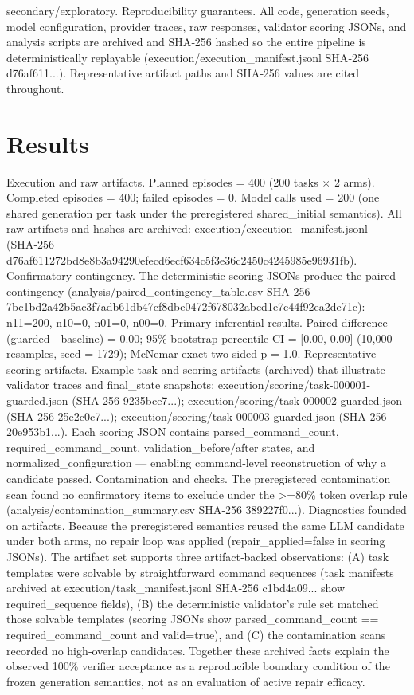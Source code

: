 \documentclass[conference]{IEEEtran}
\begin{document}
secondary/exploratory. Reproducibility guarantees. All code, generation seeds, model configuration, provider traces, raw responses, validator scoring JSONs, and analysis scripts are archived and SHA‑256 hashed so the entire pipeline is deterministically replayable (execution/execution\_manifest.jsonl SHA‑256 d76af611...). Representative artifact paths and SHA‑256 values are cited throughout.

\section{Results}
Execution and raw artifacts. Planned episodes = 400 (200 tasks \ensuremath{\times} 2 arms). Completed episodes = 400; failed episodes = 0. Model calls used = 200 (one shared generation per task under the preregistered shared\_initial semantics). All raw artifacts and hashes are archived: execution/execution\_manifest.jsonl (SHA‑256 d76af611272bd8e8b3a94290efecd6ecf634c5f3e36c2450c4245985e96931fb). Confirmatory contingency. The deterministic scoring JSONs produce the paired contingency (analysis/paired\_contingency\_table.csv SHA‑256 7bc1bd2a42b5ac3f7adb61db47cf8dbe0472f678032abcd1e7c44f92ea2de71c): n11=200, n10=0, n01=0, n00=0. Primary inferential results. Paired difference (guarded - baseline) = 0.00; 95\% bootstrap percentile CI = [0.00, 0.00] (10,000 resamples, seed = 1729); McNemar exact two‑sided p = 1.0. Representative scoring artifacts. Example task and scoring artifacts (archived) that illustrate validator traces and final\_state snapshots: execution/scoring/task-000001-guarded.json (SHA‑256 9235bce7...); execution/scoring/task-000002-guarded.json (SHA‑256 25e2c0c7...); execution/scoring/task-000003-guarded.json (SHA‑256 20e953b1...). Each scoring JSON contains parsed\_command\_count, required\_command\_count, validation\_before/after states, and normalized\_configuration --- enabling command‑level reconstruction of why a candidate passed. Contamination and checks. The preregistered contamination scan found no confirmatory items to exclude under the >=80\% token overlap rule (analysis/contamination\_summary.csv SHA‑256 389227f0...). Diagnostics founded on artifacts. Because the preregistered semantics reused the same LLM candidate under both arms, no repair loop was applied (repair\_applied=false in scoring JSONs). The artifact set supports three artifact‑backed observations: (A) task templates were solvable by straightforward command sequences (task manifests archived at execution/task\_manifest.jsonl SHA‑256 c1bd4a09... show required\_sequence fields), (B) the deterministic validator's rule set matched those solvable templates (scoring JSONs show parsed\_command\_count == required\_command\_count and valid=true), and (C) the contamination scans recorded no high‑overlap candidates. Together these archived facts explain the observed 100\% verifier acceptance as a reproducible boundary condition of the frozen generation semantics, not as an evaluation of active repair efficacy.
\end{document}

